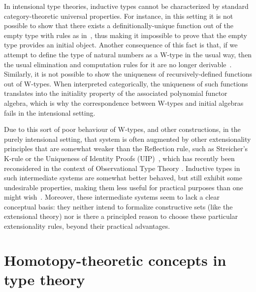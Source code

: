 \documentclass[10pt,a4paper,oneside,reqno]{amsart}
\numberwithin{equation}{section}
\theoremstyle{mythm}
\theoremstyle{mydef}
\theoremstyle{myrmk}
\begin{document}
In intensional type theories, inductive types cannot be characterized by standard category-theoretic
universal properties. For instance, in this setting it is not possible to show that there exists a 
definitionally-unique function out of the empty type with rules as in~\cite[Section~5.2]{NordstromB:marltt}, thus making it impossible to prove that the empty type provides an initial object. 
Another consequence of this fact is that, if we attempt to define the type of 
natural numbers as a W-type in the usual way, then 
the usual elimination and computation rules for it are no longer derivable~\cite{DybjerP:repids}. Similarly, it is not possible to show the uniqueness of recursively-defined functions out of W-types. When interpreted categorically, the uniqueness of such functions translates into the initiality property of the associated polynomial functor algebra, which is why the correspondence between W-types and initial algebras fails in the intensional setting.

Due to this sort of poor behaviour of W-types, and other constructions, in the purely intensional setting, that system is often augmented by other extensionality principles that are somewhat weaker than the Reflection rule, such as Streicher's K-rule  or the Uniqueness of Identity Proofs (UIP)~\cite{StreicherT:invitt}, which has recently been reconsidered
in the context of Observational Type Theory \cite{AltenkirchT:obsen}.  Inductive types in such intermediate systems are somewhat better behaved, but still exhibit some undesirable properties, making them less useful for practical purposes than one might wish~\cite{McBrideC:wtygnb}.  Moreover, these intermediate systems seem to lack a clear conceptual basis:  they neither intend to formalize constructive sets (like the extensional theory) nor is there a principled reason to choose these particular extensionality rules, beyond their practical advantages.  


\newpage

\section{Homotopy-theoretic concepts in type theory}
\label{sec:bac}
\end{document}
